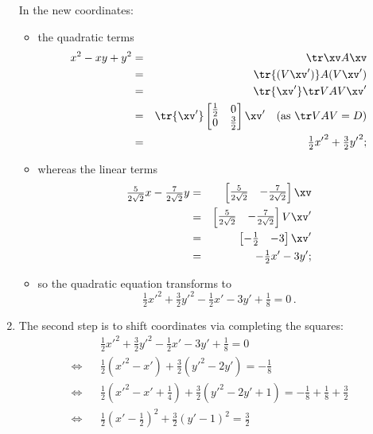\begin{example}
\begin{solution}
\begin{enumerate}
\begin{figbox}{}
\begin{equation*}
\end{equation*}
\end{figbox}
In the new coordinates: 
\begin{itemize}
\item the quadratic terms
\begin{eqnarray*}
x^2-xy+y^2&=&\tr\xv A\xv
\\&=&\tr{(V\xv')}A(V\xv')
\\&=&\tr{\xv'}\tr VAV\xv'
\\&=&\tr{\xv'}\begin{bmatrix} \tfrac12&0\\0&\tfrac32 \end{bmatrix}\xv'
\quad(\text{as }\tr VAV=D)
\\&=&\tfrac12{x'}^2+\tfrac32{y'}^2;
\end{eqnarray*}
\item whereas the linear terms
\begin{eqnarray*}
\tfrac5{2\sqrt2}x-\tfrac7{2\sqrt2}y
&=&\begin{bmatrix} \tfrac5{2\sqrt2}&-\tfrac7{2\sqrt2} \end{bmatrix}\xv
\\&=&\begin{bmatrix} \tfrac5{2\sqrt2}&-\tfrac7{2\sqrt2} \end{bmatrix}V\xv'
\\&=&\begin{bmatrix} -\tfrac12&-3 \end{bmatrix}\xv'
\\&=&-\tfrac12x'-3y';
\end{eqnarray*}
\item so the quadratic equation transforms to
\begin{equation*}
\tfrac12{x'}^2+\tfrac32{y'}^2-\tfrac12x'-3y'+\tfrac18=0\,.
\end{equation*}
\end{itemize}

\item 
\begin{figbox}{}%
The second step is to shift coordinates via completing the squares:
\begin{eqnarray*}
&&\tfrac12{x'}^2+\tfrac32{y'}^2-\tfrac12x'-3y'+\tfrac18=0
\\\iff&&
\tfrac12({x'}^2-x')+\tfrac32({y'}^2-2y')=-\tfrac18
\\\iff&&
\tfrac12({x'}^2-x'+\tfrac14)+\tfrac32({y'}^2-2y'+1)=-\tfrac18+\tfrac18+\tfrac32
\\\iff&&
\tfrac12(x'-\tfrac12)^2+\tfrac32(y'-1)^2=\tfrac32
\end{eqnarray*}
\end{figbox}


\end{enumerate}
\end{solution}
\end{example}
